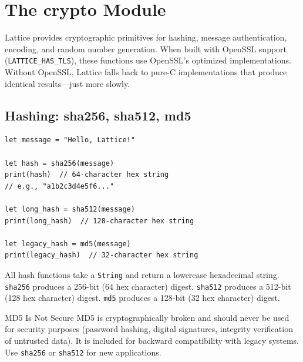 \section{The crypto Module}\label{sec:crypto-module}


Lattice provides cryptographic primitives for hashing, message
authentication, encoding, and random number generation. When built with
OpenSSL support (\texttt{LATTICE\_HAS\_TLS}), these functions use OpenSSL's
optimized implementations. Without OpenSSL, Lattice falls back to pure-C
implementations that produce identical results---just more slowly.

\subsection{Hashing: sha256, sha512, md5}\label{sec:hashing}

\begin{lstlisting}[language=Lattice, caption={Computing cryptographic hashes}]
let message = "Hello, Lattice!"

let hash = sha256(message)
print(hash)  // 64-character hex string
// e.g., "a1b2c3d4e5f6..."

let long_hash = sha512(message)
print(long_hash)  // 128-character hex string

let legacy_hash = md5(message)
print(legacy_hash)  // 32-character hex string
\end{lstlisting}

All hash functions take a \lstinline|String| and return a lowercase
hexadecimal string. \lstinline|sha256| produces a 256-bit (64 hex character)
digest. \lstinline|sha512| produces a 512-bit (128 hex character) digest.
\lstinline|md5| produces a 128-bit (32 hex character) digest.

\begin{warnbox}{MD5 Is Not Secure}
MD5 is cryptographically broken and should never be used for security
purposes (password hashing, digital signatures, integrity verification of
untrusted data). It is included for backward compatibility with legacy
systems. Use \lstinline|sha256| or \lstinline|sha512| for new applications.
\end{warnbox}

